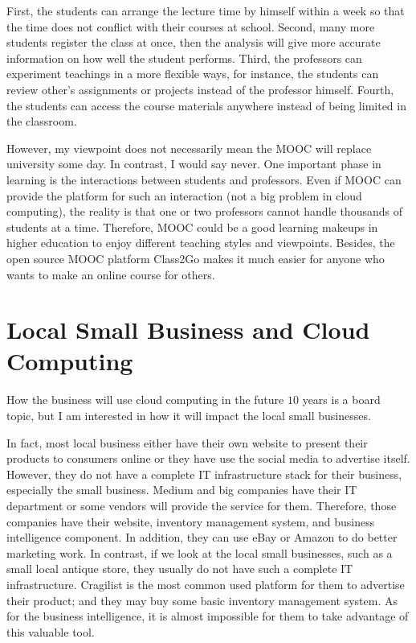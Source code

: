 First, the students can arrange the lecture time by himself within a week so that the time does not conflict with their courses at school. Second, many more students register the class at once, then the analysis will give more accurate information on how well the student performs. Third, the professors can experiment teachings in a more flexible ways, for instance, the students can review other's assignments or projects instead of the professor himself. Fourth, the students can access the course materials anywhere instead of being limited in the classroom.

However, my viewpoint does not necessarily mean the MOOC will replace university some day. In contrast, I would say never. One important phase in learning is the interactions between students and professors. Even if MOOC can provide the platform for such an interaction (not a big problem in cloud computing), the reality is that one or two professors cannot handle thousands of students at a time. Therefore, MOOC could be a good learning makeups in higher education to enjoy different teaching styles and viewpoints. Besides, the open source MOOC platform Class2Go\cite{class2go} makes it much easier for anyone who wants to make an online course for others.

\section{Local Small Business and Cloud Computing}
How the business will use cloud computing in the future $10$ years is a board topic, but I am interested in how it will impact the local small businesses. 


In fact, most local business either have their own website to present their products to consumers online or they have use the social media to advertise itself. However, they do not have a complete IT infrastructure stack for their business, especially the small business. Medium and big companies have their IT department or some vendors will provide the service for them. Therefore, those companies have their website, inventory management system, and business intelligence component. In addition, they can use eBay or Amazon to do better marketing work. In contrast, if we look at the local small businesses, such as a small local antique store, they usually do not have such a complete IT infrastructure. Cragilist is the most common used platform for them to advertise their product; and they may buy some basic inventory management system. As for the business intelligence, it is almost impossible for them to take advantage of this valuable tool.

